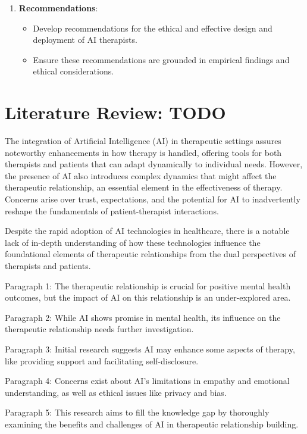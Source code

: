 \documentclass[12pt]{article}
\begin{document}
\begin{enumerate}
        \item \textbf{Recommendations}:
        \begin{itemize}
            \item Develop recommendations for the ethical and effective design and deployment of AI therapists.
            \item Ensure these recommendations are grounded in empirical findings and ethical considerations.
        \end{itemize}

    \end{enumerate}



    \section{Literature Review: TODO}

    The integration of Artificial Intelligence (AI) in therapeutic settings assures noteworthy enhancements in how therapy is handled, offering tools for both therapists and patients that can adapt dynamically to individual needs. However, the presence of AI also introduces complex dynamics that might affect the therapeutic relationship, an essential element in the effectiveness of therapy. Concerns arise over trust, expectations, and the potential for AI to inadvertently reshape the fundamentals of patient-therapist interactions.

    Despite the rapid adoption of AI technologies in healthcare, there is a notable lack of in-depth understanding of how these technologies influence the foundational elements of therapeutic relationships from the dual perspectives of therapists and patients.

    Paragraph 1: The therapeutic relationship is crucial for positive mental health outcomes, but the impact of AI on this relationship is an under-explored area.

    Paragraph 2: While AI shows promise in mental health, its influence on the therapeutic relationship needs further investigation.

    Paragraph 3: Initial research suggests AI may enhance some aspects of therapy, like providing support and facilitating self-disclosure.

    Paragraph 4: Concerns exist about AI's limitations in empathy and emotional understanding, as well as ethical issues like privacy and bias.

    Paragraph 5: This research aims to fill the knowledge gap by thoroughly examining the benefits and challenges of AI in therapeutic relationship building.
\end{document}
